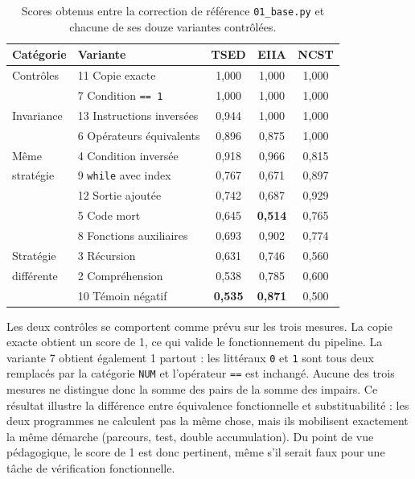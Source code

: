 \documentclass[12pt,a4paper,oneside]{report}
\begin{document}
\begin{table}[htbp]
\centering
\small
\renewcommand{\arraystretch}{1.15}
\begin{tabular}{llccc}
\toprule
\textbf{Catégorie} & \textbf{Variante} &
\textcolor{tsedcol}{\textbf{TSED}} & \textcolor{eiiacol}{\textbf{EIIA}} &
\textcolor{ncstcol}{\textbf{NCST}} \\
\midrule
Contrôles  & 11 Copie exacte                  & 1,000 & 1,000 & 1,000 \\
           & 7 Condition \texttt{== 1}        & 1,000 & 1,000 & 1,000 \\
\midrule
Invariance & 13 Instructions inversées        & 0,944 & 1,000 & 1,000 \\
           & 6 Opérateurs équivalents         & 0,896 & 0,875 & 1,000 \\
\midrule
Même       & 4 Condition inversée             & 0,918 & 0,966 & 0,815 \\
stratégie  & 9 \texttt{while} avec index      & 0,767 & 0,671 & 0,897 \\
           & 12 Sortie ajoutée                & 0,742 & 0,687 & 0,929 \\
           & 5 Code mort                      & 0,645 & \textbf{0,514} & 0,765 \\
           & 8 Fonctions auxiliaires          & 0,693 & 0,902 & 0,774 \\
\midrule
Stratégie  & 3 Récursion                      & 0,631 & 0,746 & 0,560 \\
différente & 2 Compréhension                  & 0,538 & 0,785 & 0,600 \\
           & 10 Témoin négatif                & \textbf{0,535} & \textbf{0,871} & 0,500 \\
\bottomrule
\end{tabular}
\caption{Scores obtenus entre la correction de référence \texttt{01\_base.py}
et chacune de ses douze variantes contrôlées.}
\label{tab:res_variantes}
\end{table}

Les deux contrôles se comportent comme prévu sur les trois mesures. La copie
exacte obtient un score de 1, ce qui valide le fonctionnement du pipeline.
La variante 7 obtient également 1 partout : les littéraux \texttt{0} et
\texttt{1} sont tous deux remplacés par la catégorie \texttt{NUM} et
l'opérateur \texttt{==} est inchangé. Aucune des trois mesures ne distingue
donc la somme des pairs de la somme des impairs. Ce résultat illustre la
différence entre équivalence fonctionnelle et substituabilité : les deux
programmes ne calculent pas la même chose, mais ils mobilisent exactement la
même démarche (parcours, test, double accumulation). Du point de vue
pédagogique, le score de 1 est donc pertinent, même s'il serait faux pour une
tâche de vérification fonctionnelle.
\end{document}
